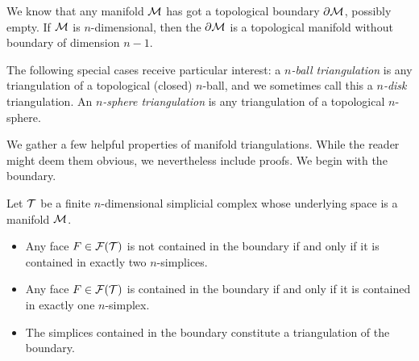 \documentclass[12pt,a4paper]{article}
\begin{document}
We know that any manifold ${\mathcal M}$ has got a topological boundary $\partial{\mathcal M}$, possibly empty. 
If ${\mathcal M}$ is $n$-dimensional, then the $\partial{\mathcal M}$ is a topological manifold without boundary of dimension $n-1$. 

The following special cases receive particular interest:
a \textit{$n$-ball triangulation} is any triangulation of a topological (closed) $n$-ball,
and we sometimes call this a \textit{$n$-disk} triangulation.
An \textit{$n$-sphere triangulation} is any triangulation of a topological $n$-sphere. 

We gather a few helpful properties of manifold triangulations. 
While the reader might deem them obvious, we nevertheless include proofs. 
We begin with the boundary.

\begin{lemma}\label{lemma:boundarysimplices}
    Let ${\mathcal T}$ be a finite $n$-dimensional simplicial complex whose underlying space is a manifold ${\mathcal M}$. 
    \begin{itemize}
        \item Any face $F \in {\mathcal F}({\mathcal T})$ is not contained in the boundary if and only if it is contained in exactly two $n$-simplices.
        \item Any face $F \in {\mathcal F}({\mathcal T})$ is contained in the boundary if and only if it is contained in exactly one $n$-simplex.
        \item The simplices contained in the boundary constitute a triangulation of the boundary.
    \end{itemize}
\end{lemma}
\end{document}
